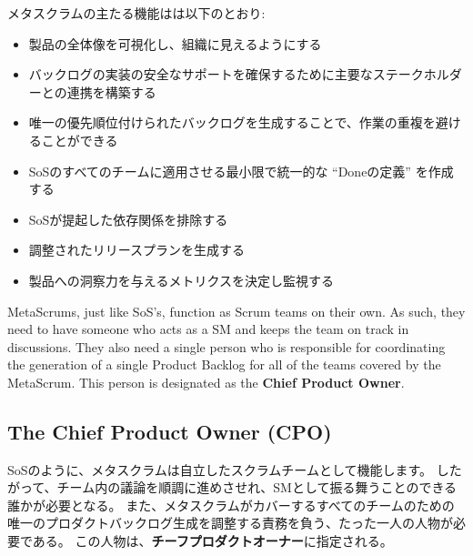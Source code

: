 \documentclass[12pt,a4paper,parskip=full]{scrartcl}
\begin{document}
メタスクラムの主たる機能はは以下のとおり:
\begin{itemize}
\item 製品の全体像を可視化し、組織に見えるようにする
\item バックログの実装の安全なサポートを確保するために主要なステークホルダーとの連携を構築する
\item 唯一の優先順位付けられたバックログを生成することで、作業の重複を避けることができる
\item SoSのすべてのチームに適用させる最小限で統一的な ``Doneの定義'' を作成する
\item SoSが提起した依存関係を排除する
\item 調整されたリリースプランを生成する
\item 製品への洞察力を与えるメトリクスを決定し監視する
\end{itemize}
MetaScrums, just like SoS's, function as Scrum teams on their own. As such,
they need to have someone who acts as a SM and keeps the team on track in
discussions. They also need a single person who is responsible for coordinating the
generation of a single Product Backlog for all of the teams covered by the
MetaScrum. This person is designated as the \textbf{Chief Product Owner}.

\subsection{The Chief Product Owner (CPO)}
\fi
SoSのように、メタスクラムは自立したスクラムチームとして機能します。
したがって、チーム内の議論を順調に進めさせれ、SMとして振る舞うことのできる誰かが必要となる。
また、メタスクラムがカバーするすべてのチームのための唯一のプロダクトバックログ生成を調整する責務を負う、たった一人の人物が必要である。
この人物は、\textbf{チーフプロダクトオーナー}に指定される。
\end{document}
